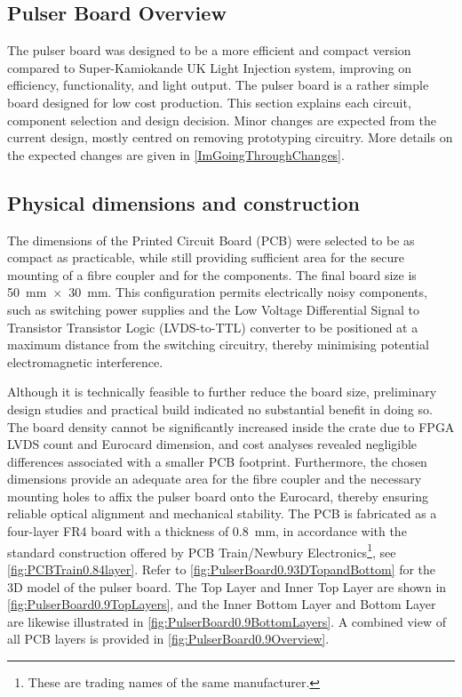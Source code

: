 \documentclass[a4paper,11pt]{article}
\begin{document}
\subsection{Pulser Board Overview}

The pulser board was designed to be a more efficient and compact version compared to Super-Kamiokande UK Light Injection system, improving on efficiency, functionality, and light output. The pulser board is a rather simple board designed for low cost production. This section explains each circuit, component selection and design decision. Minor changes are expected from the current design, mostly centred on removing prototyping circuitry. More details on the expected changes are given in \cref{ImGoingThroughChanges}.


\subsection{Physical dimensions and construction}

The dimensions of the Printed Circuit Board (PCB) were selected to be as compact as practicable, while still providing sufficient area for the secure mounting of a fibre coupler and for the components. The final board size is 50~mm~$\times$~30~mm. This configuration permits electrically noisy components, such as switching power supplies and the Low Voltage Differential Signal to Transistor Transistor Logic (LVDS-to-TTL) converter to be positioned at a maximum distance from the switching circuitry, thereby minimising potential electromagnetic interference.

Although it is technically feasible to further reduce the board size, preliminary design studies and practical build indicated no substantial benefit in doing so. The board density cannot be significantly increased inside the crate due to  FPGA LVDS count and Eurocard dimension, and cost analyses revealed negligible differences associated with a smaller PCB footprint. Furthermore, the chosen dimensions provide an adequate area for the fibre coupler and the necessary mounting holes to affix the pulser board onto the Eurocard, thereby ensuring reliable optical alignment and mechanical stability.
The PCB is fabricated as a four-layer FR4 \cite{FR-4}  board with a thickness of 0.8~mm, in accordance with the standard construction offered by PCB Train/Newbury Electronics\footnote{These are trading names of the same manufacturer.}, see \cref{fig:PCBTrain0.84layer}. Refer to \cref{fig:PulserBoard0.93DTopandBottom} for the 3D model of the pulser board. The Top Layer and Inner Top Layer are shown in \cref{fig:PulserBoard0.9TopLayers}, and the Inner Bottom Layer and Bottom Layer are likewise illustrated in \cref{fig:PulserBoard0.9BottomLayers}. A combined view of all PCB layers is provided in \cref{fig:PulserBoard0.9Overview}.
\end{document}
